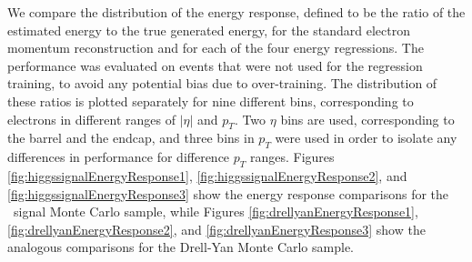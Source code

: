 \documentclass{cmspaper}
\begin{document}
We compare the distribution of the energy response, defined to be the ratio of the estimated energy to the true generated energy,
for the standard electron momentum reconstruction and for each of the four energy regressions. The performance was evaluated  
on events that were not used for the regression training, to avoid any potential bias due to over-training. 
The distribution of these ratios is plotted separately for nine different bins, corresponding to electrons in 
different ranges of $|\eta|$ and $p_T$. Two $\eta$ bins are used, corresponding to the barrel and the endcap, and
three bins in $p_T$ were used in order to isolate any differences in performance for difference $p_{T}$ ranges. 
Figures \ref{fig:higgssignalEnergyResponse1}, \ref{fig:higgssignalEnergyResponse2}, and \ref{fig:higgssignalEnergyResponse3} show the 
energy response comparisons for the \HiggsToZZ\ signal Monte Carlo sample, while 
Figures \ref{fig:drellyanEnergyResponse1}, \ref{fig:drellyanEnergyResponse2}, and \ref{fig:drellyanEnergyResponse3} show the 
analogous comparisons for the Drell-Yan Monte Carlo sample. 
\end{document}
